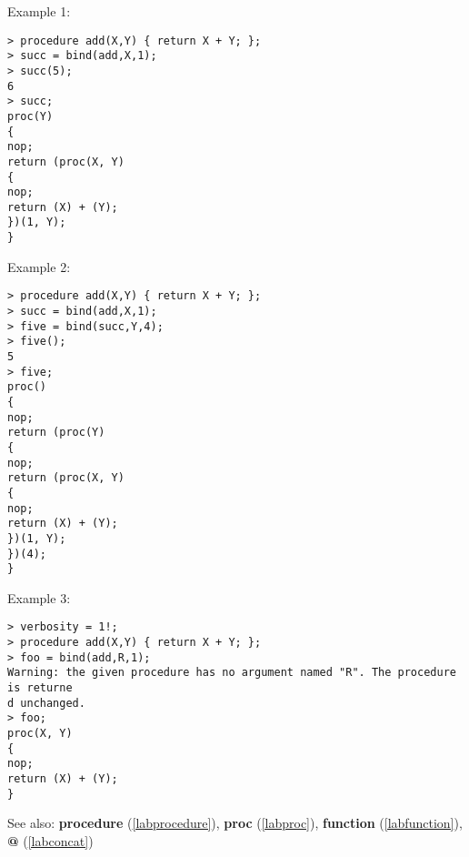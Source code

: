 \noindent Example 1: 
\begin{center}\begin{minipage}{15cm}\begin{Verbatim}[frame=single,commandchars=\\\|\~]
> procedure add(X,Y) { return X + Y; };
> succ = bind(add,X,1);
> succ(5);
6
> succ;
proc(Y)
{
nop;
return (proc(X, Y)
{
nop;
return (X) + (Y);
})(1, Y);
}
\end{Verbatim}
\end{minipage}\end{center}
\noindent Example 2: 
\begin{center}\begin{minipage}{15cm}\begin{Verbatim}[frame=single,commandchars=\\\|\~]
> procedure add(X,Y) { return X + Y; };
> succ = bind(add,X,1);
> five = bind(succ,Y,4);
> five();
5
> five;
proc()
{
nop;
return (proc(Y)
{
nop;
return (proc(X, Y)
{
nop;
return (X) + (Y);
})(1, Y);
})(4);
}
\end{Verbatim}
\end{minipage}\end{center}
\noindent Example 3: 
\begin{center}\begin{minipage}{15cm}\begin{Verbatim}[frame=single,commandchars=\\\|\~]
> verbosity = 1!;
> procedure add(X,Y) { return X + Y; };
> foo = bind(add,R,1);
Warning: the given procedure has no argument named "R". The procedure is returne
d unchanged.
> foo;
proc(X, Y)
{
nop;
return (X) + (Y);
}
\end{Verbatim}
\end{minipage}\end{center}
See also: \textbf{procedure} (\ref{labprocedure}), \textbf{proc} (\ref{labproc}), \textbf{function} (\ref{labfunction}), \textbf{@} (\ref{labconcat})

